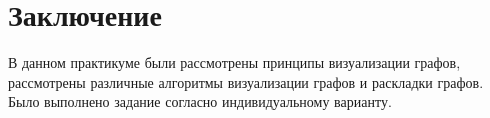 \chapter*{Заключение}

В данном практикуме были рассмотрены принципы визуализации графов, 
рассмотрены различные алгоритмы визуализации графов и раскладки графов. 
Было выполнено задание согласно индивидуальному варианту.
